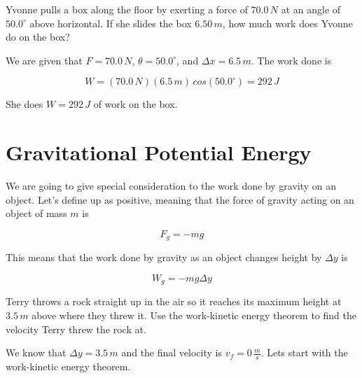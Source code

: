\documentclass[12pt]{book}
\begin{document}
\begin{exampleblock}

Yvonne pulls a box along the floor by exerting a force of $70.0 \, N$ at an angle of $50.0^{\circ}$ above horizontal. If she slides the box $6.50 \, m$, how much work does Yvonne do on the box?

\hspace{10pt}

We are given that $F = 70.0 \, N$, $\theta = 50.0^{\circ}$, and $\Delta x = 6.5 \, m$. The work done is

\begin{equation}
W = (70.0 \, N) (6.5 \, m) \, cos(50.0^{\circ}) = 292 \, J
\end{equation}

She does $W = 292 \, J$ of work on the box.

\end{exampleblock}

\section{Gravitational Potential Energy}

We are going to give special consideration to the work done by gravity on an object. Let's define up as positive, meaning that the force of gravity acting on an object of mass $m$ is

\begin{equation}
F_g = -mg
\end{equation}

This means that the work done by gravity as an object changes height by $\Delta y$ is

\begin{equation}
W_g = -mg \Delta y
\end{equation}

\begin{exampleblock}

Terry throws a rock straight up in the air so it reaches its maximum height at $3.5 \, m$ above where they threw it. Use the work-kinetic energy theorem to find the velocity Terry threw the rock at.

\hspace{10pt}

We know that $\Delta y = 3.5 \, m$ and the final velocity is $v_f = 0 \, \frac{m}{s}$. Lets start with the work-kinetic energy theorem.

\end{exampleblock}
\end{document}
